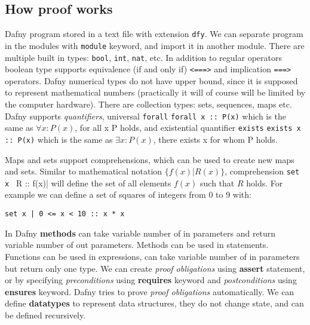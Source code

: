 \subsection{How proof works}
Dafny program stored in a text file with extension \texttt{dfy}. We can separate program in the modules with \texttt{module} keyword, and import it in another module. There are multiple built in types: \texttt{bool}, \texttt{int}, \texttt{nat}, etc. In addition to regular operators boolean type supports equivalence (if and only if) \texttt{<===>} and implication \texttt{===>} operators. Dafny numerical types do not have upper bound, since it is supposed to represent mathematical numbers (practically it will of course will be limited by the computer hardware). There are collection types: sets, sequences, maps etc. Dafny supports \textit{quantifiers}, universal \texttt{forall}
\verb|forall x :: P(x)|
which is the same as $\forall{x}: P(x)$, for all x P holds, and existential quantifier \texttt{exists}
\verb|exists x :: P(x)|
which is the same as $\exists{x}: P(x)$, there exists x for whom P holds.

Maps and sets support comprehensions, which can be used to create new maps and sets. Similar to mathematical notation $\{f(x) | R(x)\}$, comprehension
\verb|set x | R :: f(x)| will define the set of all elements $f(x)$ such that $R$ holds. For example we can define a set of squares of integers from 0 to 9 with:
\begin{lstlisting}[language=Dafny,caption={Set comprehension},label={lst:comprehension}]
set x | 0 <= x < 10 :: x * x
\end{lstlisting}

In Dafny \textbf{methods} can take variable number of in parameters and return variable number of out parameters. Methods can be used in statements. Functions can be used in expressions, can take variable number of in parameters but return only one type. We can create \textit{proof obligations} using \textbf{assert} statement, or by specifying \textit{preconditions} using \textbf{requires} keyword and \textit{postconditions} using \textbf{ensures} keyword. Dafny tries to prove \textit{proof obligations} automatically.
We can define \textbf{datatypes} to represent data structures, they do not change state, and can be defined recursively.


